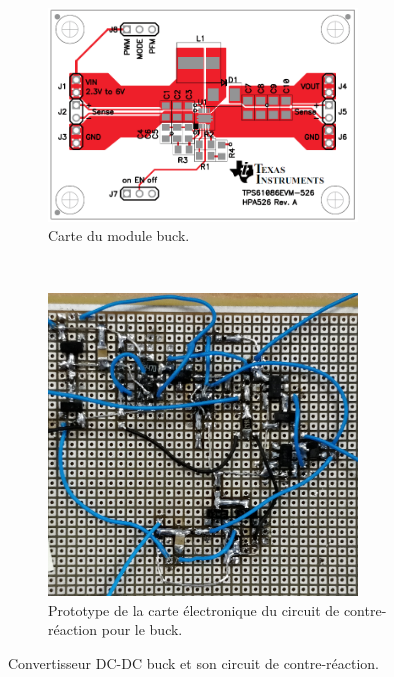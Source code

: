 \begin{figure}[H]
    \centering
    \begin{subfigure}[t]{0.45\textwidth}
        \centering
        \includegraphics[width=0.90\textwidth]{images/carte-buck}
        \caption{Carte du module buck.}
    \end{subfigure}%
    ~ 
    \begin{subfigure}[t]{0.45\textwidth}
        \centering
        \includegraphics[width=0.90\textwidth]{images/carte-contre-reaction-buck-v1}
        \caption{Prototype de la carte électronique du circuit de contre-réaction pour le buck.}
    \end{subfigure}
    \caption{Convertisseur DC-DC buck et son circuit de contre-réaction.}
\end{figure}


